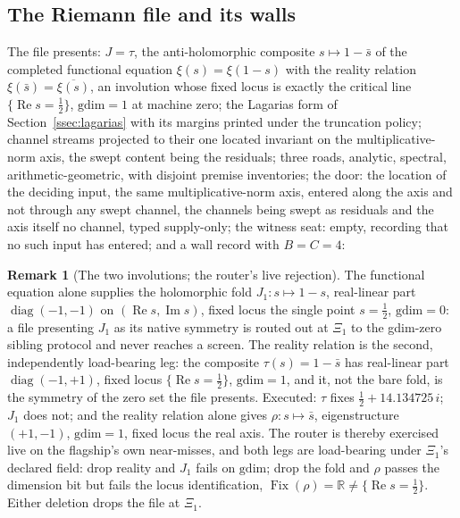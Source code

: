 \documentclass[twocolumn,10pt]{article}
\theoremstyle{plain}
\theoremstyle{definition}
\newtheorem{remark}[theorem]{Remark}
\newcommand{\Rl}{\mathbb{R}}
\begin{document}
\subsection{The Riemann file and its walls}
The file presents: $J=\tau$, the anti-holomorphic composite $s\mapsto 1-\bar s$ of the completed functional equation $\xi(s)=\xi(1-s)$ \cite{Riemann1859} with the reality relation $\xi(\bar s)=\overline{\xi(s)}$, an involution whose fixed locus is exactly the critical line $\{\operatorname{Re}s=\tfrac12\}$, $\mathrm{gdim}=1$ at machine zero; the Lagarias form of Section~\ref{ssec:lagarias} with its margins printed under the truncation policy; channel streams projected to their one located invariant on the multiplicative-norm axis, the swept content being the residuals; three roads, analytic, spectral, arithmetic-geometric, with disjoint premise inventories; the door: the location of the deciding input, the same multiplicative-norm axis, entered along the axis and not through any swept channel, the channels being swept as residuals and the axis itself no channel, typed supply-only; the witness seat: empty, recording that no such input has entered; and a wall record with $B=C=4$:

\begin{remark}[The two involutions; the router's live rejection]\label{rem:tau}
The functional equation alone supplies the holomorphic fold $J_1\colon s\mapsto 1-s$, real-linear part $\operatorname{diag}(-1,-1)$ on $(\operatorname{Re}s,\operatorname{Im}s)$, fixed locus the single point $s=\tfrac12$, $\mathrm{gdim}=0$: a file presenting $J_1$ as its native symmetry is routed out at $\Xi_1$ to the gdim-zero sibling protocol and never reaches a screen. The reality relation is the second, independently load-bearing leg: the composite $\tau(s)=1-\bar s$ has real-linear part $\operatorname{diag}(-1,+1)$, fixed locus $\{\operatorname{Re}s=\tfrac12\}$, $\mathrm{gdim}=1$, and it, not the bare fold, is the symmetry of the zero set the file presents. Executed: $\tau$ fixes $\tfrac12+14.134725\,i$; $J_1$ does not; and the reality relation alone gives $\rho\colon s\mapsto\bar s$, eigenstructure $(+1,-1)$, $\mathrm{gdim}=1$, fixed locus the real axis. The router is thereby exercised live on the flagship's own near-misses, and both legs are load-bearing under $\Xi_1$'s declared field: drop reality and $J_1$ fails on $\mathrm{gdim}$; drop the fold and $\rho$ passes the dimension bit but fails the locus identification, $\operatorname{Fix}(\rho)=\Rl\ne\{\operatorname{Re}s=\tfrac12\}$. Either deletion drops the file at $\Xi_1$.
\end{remark}
\end{document}
